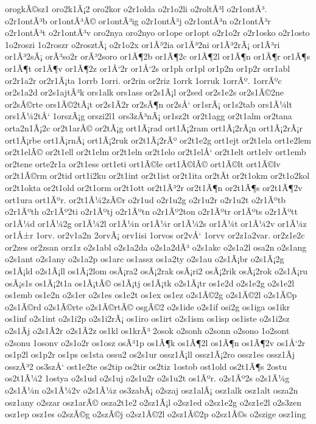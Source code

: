 {orogkÃ©sz1
oro2k1Ã¡2
oro2kor
o2r1olda
o2r1o2li
o2roltÃ³l
o2r1ontÃ³.
o2r1ontÃ³b
or1ontÃ³Ã©
or1ontÃ³ig
o2r1ontÃ³j
o2r1ontÃ³n
o2r1ontÃ³r
o2r1ontÃ³t
o2r1ontÃ³v
oro2nya
oro2nyo
or1ope
or1opt
o2r1o2r
o2r1osko
o2r1osto
1o2roszi
1o2roszr
o2rosztÃ¡
o2r1o2x
or1Ã³2ia
or1Ã³2ni
or1Ã³2rÃ¡
or1Ã³ri
or1Ã³2sÃ¡
orÃ³so2r
orÃ³2soro
or1Ã¶2b
or1Ã¶2c
or1Ã¶2l
or1Ã¶n
or1Ã¶r
or1Ã¶s
or1Ã¶t
or1Ã¶v
or1Ã¶2z
or1Å‘2r
or1Å‘2s
or1ph
or1pl
or1p2n
or1p2r
orr1abl
or2r1a2r
or2r1Ã¡ta
1orrb
1orri.
or2rin
or2riz
1orrk
1orruk
1orrÃº.
1orrÃºc
or2s1a2d
or2s1ajtÃ³k
ors1alk
ors1ass
or2s1Ã¡l
or2sed
or2s1e2s
or2s1Ã©2ne
or2sÃ©rte
ors1Ã©2tÃ¡t
or2s1Ã­2r
or2sÃ¶n
or2sÅ‘
or1srÃ¡
or1s2tab
ors1Ã¼lt
ors1Ã¼2tÅ‘
1orszÃ¡g
orszi2l1
ors3zÃ³nÃ¡
or1sz2t
or2t1agg
or2t1alm
or2tana
orta2n1Ã¡2c
or2t1arÃ©
or2tÃ¡g
ort1Ã¡rad
ort1Ã¡2ram
ort1Ã¡2rÃ¡n
ort1Ã¡2rÃ¡r
ort1Ã¡rbe
ort1Ã¡rnÃ¡
ort1Ã¡2ruk
or2t1Ã¡2rÃº
or2t1e2g
ort1ejt
or2t1ela
ort1e2lem
or2t1elÃ©
or2t1ell
or2t1elm
or2t1eln
or2t1elo
or2t1elÅ‘
or2t1elt
ort1elv
ort1emb
or2tene
orte2r1a
or2t1ess
ort1eti
ort1Ã©le
ort1Ã©lÃ©
ort1Ã©lt
ort1Ã©lv
or2t1Ã©rm
or2tid
ort1i2ku
or2t1int
or2t1ist
or2t1ita
or2tÃ­t
or2t1okm
or2t1o2kol
or2t1okta
or2t1old
or2t1orm
or2t1ott
or2t1Ã³2r
or2t1Ã¶n
or2t1Ã¶s
or2t1Ã¶2v
ort1ura
ort1Ãºr.
or2t1Ã¼2zÃ©r
o2r1ud
o2r1u2g
o2r1u2r
o2r1u2t
o2r1Ãºtb
o2r1Ãºth
o2r1Ãº2ti
o2r1Ãºtj
o2r1Ãºtn
o2r1Ãº2ton
o2r1Ãºtr
or1Ãºts
o2r1Ãºtt
or1Ã¼d
or1Ã¼2g
or1Ã¼2l
or1Ã¼n
or1Ã¼r
or1Ã¼2s
or1Ã¼t
or1Ã¼2v
or1Ã¼z
or1Å±r
1orv.
or2v1a2n
2orvÃ¡
orv1isi
1orvos
or2vÅ‘
1orvv
or2z1a2var.
or2z1e2c
or2zes
or2zsan
orz1z
o2s1abl
o2s1a2da
o2s1a2dÃ³
o2s1akc
o2s1a2l
osa2n
o2s1ang
o2s1ant
o2s1any
o2s1a2p
os1arc
os1assz
os1a2ty
o2s1au
o2s1Ã¡br
o2s1Ã¡2g
os1Ã¡ld
o2s1Ã¡ll
os1Ã¡2lom
osÃ¡ra2
osÃ¡2rak
osÃ¡ri2
osÃ¡2rik
osÃ¡2rok
o2s1Ã¡ru
osÃ¡s1s
os1Ã¡2t1a
os1Ã¡tÃ©
os1Ã¡tj
os1Ã¡tk
o2s1Ã¡tr
os1e2d
o2s1e2g
o2s1e2l
os1emb
os1e2n
o2s1er
o2s1es
os1e2t
os1ex
os1ez
o2s1Ã©2g
o2s1Ã©2l
o2s1Ã©p
o2s1Ã©rd
o2s1Ã©rte
o2s1Ã©rtÃ©
osgÃ©2
o2s1ide
o2s1if
osi2g
os1iga
os1ikr
os1inf
o2s1int
o2s1i2p
o2s1i2rÃ¡
os1iro
os1irt
o2s1ism
os1isp
os1iste
o2s1i2sz
o2s1Ã­j
o2s1Ã­2r
o2s1Ã­2z
os1kl
os1krÃ³
2osok
o2sonh
o2sonn
o2sono
1o2sont
o2sonu
1osonv
o2s1o2r
os1osz
osÃ³1p
os1Ã¶k
os1Ã¶2l
os1Ã¶n
os1Ã¶2v
os1Å‘2r
os1p2l
os1p2r
os1ps
os1sta
ossu2
os2s1ur
ossz1Ã¡ll
ossz1Ã¡2ro
ossz1es
ossz1Ã­j
osszÃ³2
os3szÅ‘
ost1e2te
os2tip
os2tir
os2tiz
1ostob
ost1old
os2t1Ã¶s
2ostu
os2t1Ã¼2
1ostya
o2s1ud
o2s1uj
o2s1u2r
o2s1u2t
os1Ãºr.
o2s1Ãº2s
o2s1Ã¼g
o2s1Ã¼n
o2s1Ã¼2v
o2s1Ã¼z
os3zabÃ¡
o2szaj
osz1alÃ¡
osz1alk
osz1alt
osza2n
osz1any
o2szar
osz1arÃ©
osza2t1e2
o2sz1Ã¡l
o2sz1ed
o2sz1e2g
o2sz1e2l
o2s3zen
osz1ep
osz1es
o2szÃ©g
o2szÃ©j
o2sz1Ã©2l
o2sz1Ã©2p
o2sz1Ã©s
o2szige
osz1ing
}
